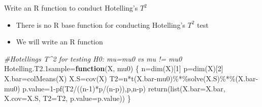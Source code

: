 \documentclass[
  ignorenonframetext,
]{beamer}
\newenvironment{Shaded}{\begin{snugshade}}{\end{snugshade}}
\newcommand{\AttributeTok}[1]{\textcolor[rgb]{0.77,0.63,0.00}{#1}}
\newcommand{\CommentTok}[1]{\textcolor[rgb]{0.56,0.35,0.01}{\textit{#1}}}
\newcommand{\ControlFlowTok}[1]{\textcolor[rgb]{0.13,0.29,0.53}{\textbf{#1}}}
\newcommand{\DecValTok}[1]{\textcolor[rgb]{0.00,0.00,0.81}{#1}}
\newcommand{\FloatTok}[1]{\textcolor[rgb]{0.00,0.00,0.81}{#1}}
\newcommand{\FunctionTok}[1]{\textcolor[rgb]{0.00,0.00,0.00}{#1}}
\newcommand{\NormalTok}[1]{#1}
\newcommand{\OtherTok}[1]{\textcolor[rgb]{0.56,0.35,0.01}{#1}}
\newcommand{\SpecialCharTok}[1]{\textcolor[rgb]{0.00,0.00,0.00}{#1}}
\providecommand{\tightlist}{%
  \setlength{\itemsep}{0pt}\setlength{\parskip}{0pt}}
\begin{document}
\begin{frame}[fragile]{Write an R function to conduct Hotelling's
\(T^2\)}
\protect\hypertarget{write-an-r-function-to-conduct-hotellings-t2}{}
\begin{itemize}
\tightlist
\item
  There is no R base function for conducting Hotelling's \(T^2\) test
\item
  We will write an R function
\end{itemize}

\tiny

\begin{Shaded}
\begin{Highlighting}[]
\CommentTok{\#Hotelling\textquotesingle{}s T\^{}2 for testing H0: mu=mu0 vs mu != mu0}
\NormalTok{Hotelling.T2}\FloatTok{.1}\NormalTok{sample}\OtherTok{=}\ControlFlowTok{function}\NormalTok{(X, mu0)}
\NormalTok{\{}
\NormalTok{  n}\OtherTok{=}\FunctionTok{dim}\NormalTok{(X)[}\DecValTok{1}\NormalTok{]}
\NormalTok{  p}\OtherTok{=}\FunctionTok{dim}\NormalTok{(X)[}\DecValTok{2}\NormalTok{]}
\NormalTok{  X.bar}\OtherTok{=}\FunctionTok{colMeans}\NormalTok{(X)}
\NormalTok{  X.S}\OtherTok{=}\FunctionTok{cov}\NormalTok{(X)}
\NormalTok{  T2}\OtherTok{=}\NormalTok{n}\SpecialCharTok{*}\FunctionTok{t}\NormalTok{(X.bar}\SpecialCharTok{{-}}\NormalTok{mu0)}\SpecialCharTok{\%*\%}\FunctionTok{solve}\NormalTok{(X.S)}\SpecialCharTok{\%*\%}\NormalTok{(X.bar}\SpecialCharTok{{-}}\NormalTok{mu0)}
\NormalTok{  p.value}\OtherTok{=}\DecValTok{1}\SpecialCharTok{{-}}\FunctionTok{pf}\NormalTok{(T2}\SpecialCharTok{/}\NormalTok{((n}\DecValTok{{-}1}\NormalTok{)}\SpecialCharTok{*}\NormalTok{p}\SpecialCharTok{/}\NormalTok{(n}\SpecialCharTok{{-}}\NormalTok{p)),p,n}\SpecialCharTok{{-}}\NormalTok{p)}
  \FunctionTok{return}\NormalTok{(}\FunctionTok{list}\NormalTok{(}\AttributeTok{X.bar=}\NormalTok{X.bar, }\AttributeTok{X.cov=}\NormalTok{X.S, }\AttributeTok{T2=}\NormalTok{T2, }\AttributeTok{p.value=}\NormalTok{p.value))}
\NormalTok{\}}
\end{Highlighting}
\end{Shaded}

\normalsize
\end{frame}
\end{document}
